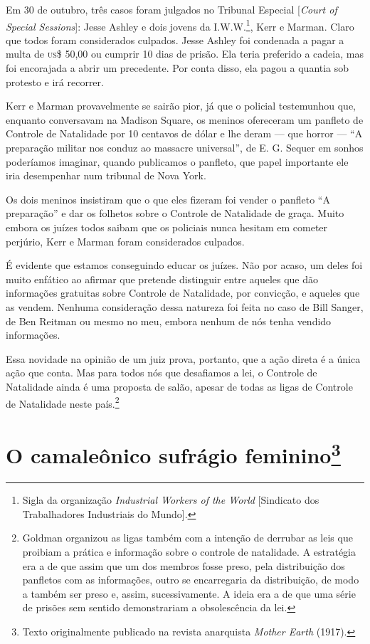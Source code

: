 Em 30 de outubro, três casos foram julgados no Tribunal Especial
{[}\emph{Court of Special Sessions}{]}: Jesse Ashley e dois jovens da
I.W.W.\footnote{Sigla da organização \emph{Industrial Workers of the
  World} {[}Sindicato dos Trabalhadores Industriais do Mundo{]}.}, Kerr
e Marman. Claro que todos foram considerados culpados. Jesse Ashley foi
condenada a pagar a multa de \textsc{us}\$ 50,00 ou cumprir 10 dias de prisão.
Ela teria preferido a cadeia, mas foi encorajada a abrir um precedente.
Por conta disso, ela pagou a quantia sob protesto e irá recorrer.

Kerr e Marman provavelmente se sairão pior, já que o policial
testemunhou que, enquanto conversavam na Madison Square, os meninos
ofereceram um panfleto de Controle de Natalidade por 10 centavos de
dólar e lhe deram --- que horror --- ``A preparação militar nos conduz
ao massacre universal'', de E. G. Sequer em sonhos poderíamos
imaginar, quando publicamos o panfleto, que papel importante ele iria
desempenhar num tribunal de Nova York.

Os dois meninos insistiram que o que eles fizeram foi vender o panfleto
``A preparação'' e dar os folhetos sobre o Controle de Natalidade de
graça. Muito embora os juízes todos saibam que os policiais nunca
hesitam em cometer perjúrio, Kerr e Marman foram considerados culpados.

É evidente que estamos conseguindo educar os juízes. Não por acaso, um
deles foi muito enfático ao afirmar que pretende distinguir entre
aqueles que dão informações gratuitas sobre Controle de Natalidade, por
convicção, e aqueles que as vendem. Nenhuma consideração dessa natureza
foi feita no caso de Bill Sanger, de Ben Reitman ou mesmo no meu, embora
nenhum de nós tenha vendido informações.

Essa novidade na opinião de um juiz prova, portanto, que a ação direta é
a única ação que conta. Mas para todos nós que desafiamos a lei, o
Controle de Natalidade ainda é uma proposta de salão, apesar de todas as
ligas de Controle de Natalidade neste país.\footnote{Goldman organizou
  as ligas também com a intenção de derrubar as leis que proibiam a
  prática e informação sobre o controle de natalidade. A estratégia era
  a de que assim que um dos membros fosse preso, pela distribuição dos panfletos com as informações, outro se encarregaria da distribuição, de modo a também ser preso e, assim, sucessivamente. A ideia era a de que uma série de prisões sem sentido demonstrariam a
  obsolescência da lei.}

\chapter{O camaleônico sufrágio feminino\footnote[*]{Texto originalmente publicado
  na revista anarquista \emph{Mother Earth} (1917).}}


